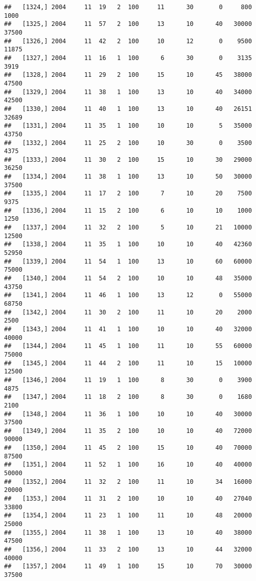 \documentclass{article}\usepackage[]{graphicx}\usepackage[]{color}
\makeatletter
\newenvironment{kframe}{%
 \def\at@end@of@kframe{}%
 \ifinner\ifhmode%
  \def\at@end@of@kframe{\end{minipage}}%
  \begin{minipage}{\columnwidth}%
 \fi\fi%
 \def\FrameCommand##1{\hskip\@totalleftmargin \hskip-\fboxsep
 \colorbox{shadecolor}{##1}\hskip-\fboxsep
     \hskip-\linewidth \hskip-\@totalleftmargin \hskip\columnwidth}%
 \MakeFramed {\advance\hsize-\width
   \@totalleftmargin\z@ \linewidth\hsize
   \@setminipage}}%
 {\par\unskip\endMakeFramed%
 \at@end@of@kframe}
\newenvironment{knitrout}{}{} %
\makeatother
\begin{document}
\begin{knitrout}
\begin{kframe}
\begin{verbatim}
##   [1324,] 2004     11  19   2  100     11      30       0     800    1000
##   [1325,] 2004     11  57   2  100     13      10      40   30000   37500
##   [1326,] 2004     11  42   2  100     10      12       0    9500   11875
##   [1327,] 2004     11  16   1  100      6      30       0    3135    3919
##   [1328,] 2004     11  29   2  100     15      10      45   38000   47500
##   [1329,] 2004     11  38   1  100     13      10      40   34000   42500
##   [1330,] 2004     11  40   1  100     13      10      40   26151   32689
##   [1331,] 2004     11  35   1  100     10      10       5   35000   43750
##   [1332,] 2004     11  25   2  100     10      30       0    3500    4375
##   [1333,] 2004     11  30   2  100     15      10      30   29000   36250
##   [1334,] 2004     11  38   1  100     13      10      50   30000   37500
##   [1335,] 2004     11  17   2  100      7      10      20    7500    9375
##   [1336,] 2004     11  15   2  100      6      10      10    1000    1250
##   [1337,] 2004     11  32   2  100      5      10      21   10000   12500
##   [1338,] 2004     11  35   1  100     10      10      40   42360   52950
##   [1339,] 2004     11  54   1  100     13      10      60   60000   75000
##   [1340,] 2004     11  54   2  100     10      10      48   35000   43750
##   [1341,] 2004     11  46   1  100     13      12       0   55000   68750
##   [1342,] 2004     11  30   2  100     11      10      20    2000    2500
##   [1343,] 2004     11  41   1  100     10      10      40   32000   40000
##   [1344,] 2004     11  45   1  100     11      10      55   60000   75000
##   [1345,] 2004     11  44   2  100     11      10      15   10000   12500
##   [1346,] 2004     11  19   1  100      8      30       0    3900    4875
##   [1347,] 2004     11  18   2  100      8      30       0    1680    2100
##   [1348,] 2004     11  36   1  100     10      10      40   30000   37500
##   [1349,] 2004     11  35   2  100     10      10      40   72000   90000
##   [1350,] 2004     11  45   2  100     15      10      40   70000   87500
##   [1351,] 2004     11  52   1  100     16      10      40   40000   50000
##   [1352,] 2004     11  32   2  100     11      10      34   16000   20000
##   [1353,] 2004     11  31   2  100     10      10      40   27040   33800
##   [1354,] 2004     11  23   1  100     11      10      48   20000   25000
##   [1355,] 2004     11  38   1  100     13      10      40   38000   47500
##   [1356,] 2004     11  33   2  100     13      10      44   32000   40000
##   [1357,] 2004     11  49   1  100     15      10      70   30000   37500

\end{verbatim}
\end{kframe}
\end{knitrout}
\end{document}
